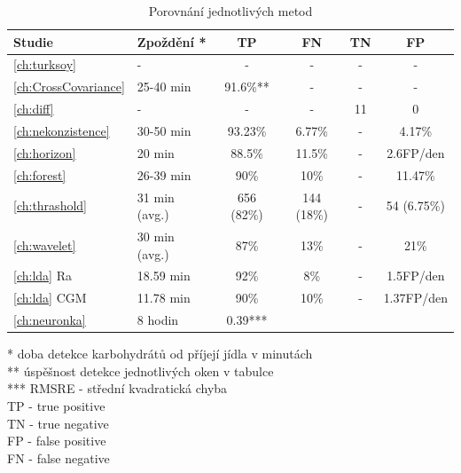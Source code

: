 \begin{table}[H]
\caption{Porovnání jednotlivých metod}
\label{tab:res}
\centering
\begin{tabular}{|l|l|c|c|c|c|}
\hline 
\textbf{Studie} & \textbf{Zpoždění *} & \textbf{TP} & \textbf{FN} & \textbf{TN} & \textbf{FP}\tabularnewline
\hline 
\hline 
\ref{ch:turksoy} & - & - & - & - & -\tabularnewline
\hline 
\ref{ch:CrossCovariance} & 25-40 min & 91.6\%{**} & - & - & -\tabularnewline
\hline 
\ref{ch:diff} & - & - & - & 11 & 0\tabularnewline
\hline 
\ref{ch:nekonzistence} & 30-50 min & 93.23\% & 6.77\% & - & 4.17\%\tabularnewline
\hline
\ref{ch:horizon} & 20 min & 88.5\% & 11.5\% & - & 2.6FP/den\tabularnewline
\hline 
\ref{ch:forest} & 26-39 min & 90\% & 10\% & - & 11.47\%\tabularnewline
\hline 
\ref{ch:thrashold} & 31 min (avg.) & 656 (82\%) & 144 (18\%) & - & 54 (6.75\%)\tabularnewline
\hline 
\ref{ch:wavelet} & 30 min (avg.) & 87\% & 13\% & - & 21\%\tabularnewline
\hline 
\ref{ch:lda} Ra & 18.59 min & 92\% & 8\% & - & 1.5FP/den\tabularnewline
\hline 
\ref{ch:lda} CGM & 11.78 min & 90\% & 10\% & - & 1.37FP/den\tabularnewline
\hline
\ref{ch:neuronka} & 8 hodin & 0.39{***} & & & \tabularnewline
\hline
\end{tabular}
\begin{flushleft}
* doba detekce karbohydrátů od příjejí jídla v minutách\\
{**} úspěšnost detekce jednotlivých oken v tabulce\\
{***} RMSRE - střední kvadratická chyba\\
TP - true positive\\
TN - true negative\\
FP - false positive\\
FN - false negative\\
\end{flushleft}
\end{table}


